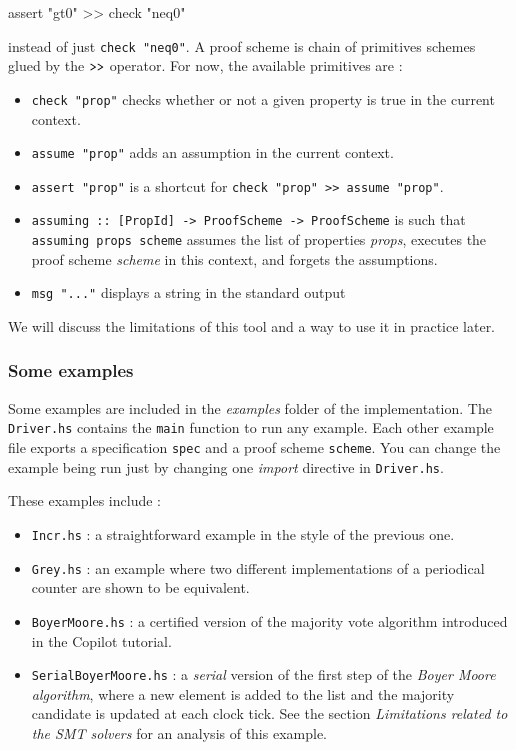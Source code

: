 \begin{code}
assert "gt0" >> check "neq0"
\end{code}


instead of just \texttt{check "neq0"}. A proof scheme is chain of
primitives schemes glued by the $\texttt{\textgreater{}\textgreater{}}$
operator. For now, the available primitives are :

\begin{itemize}
\itemsep1pt\parskip0pt
\item
  \texttt{check "prop"} checks whether or not a given property is true
  in the current context.
\item
  \texttt{assume "prop"} adds an assumption in the current context.
\item
  \texttt{assert "prop"} is a shortcut for
  \texttt{check "prop" \textgreater{}\textgreater{} assume "prop"}.
\item
  \texttt{assuming :: {[}PropId{]} -\textgreater{} ProofScheme -\textgreater{} ProofScheme}
  is such that \texttt{assuming props scheme} assumes the list of
  properties \emph{props}, executes the proof scheme \emph{scheme} in
  this context, and forgets the assumptions.
\item
  \texttt{msg "..."} displays a string in the standard output
\end{itemize}

We will discuss the limitations of this tool and a way to use it in
practice later.

\subsubsection{Some examples}\label{some-examples}


Some examples are included in the \emph{examples} folder of the implementation. The \texttt{Driver.hs}
contains the \texttt{main} function to run any example. Each other
example file exports a specification \texttt{spec} and a proof scheme
\texttt{scheme}. You can change the example being run just by changing
one \emph{import} directive in \texttt{Driver.hs}.

These examples include :

\begin{itemize}
\itemsep1pt\parskip0pt
\item
  \texttt{Incr.hs} : a straightforward example in the style of the
  previous one.
\item
  \texttt{Grey.hs} : an example where two different implementations of a
  periodical counter are shown to be equivalent.
\item
  \texttt{BoyerMoore.hs} : a certified version of the majority vote
  algorithm introduced in the Copilot tutorial.
\item
  \texttt{SerialBoyerMoore.hs} : a \emph{serial} version of the first
  step of the \emph{Boyer Moore algorithm}, where a new element is added
  to the list and the majority candidate is updated at each clock tick.
  See the section \emph{Limitations related to the SMT solvers} for an
  analysis of this example.
\end{itemize}

